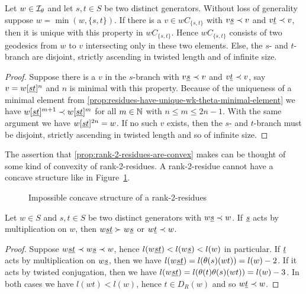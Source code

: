 \begin{prop}
	Let $w \in \mathcal{I}_{\theta}$ and let $s,t \in S$ be two distinct generators. Without loss of generality suppose $w = \min(w, \{s,t\})$. If there is a $v \in wC_{\{s,t\}}$ with $v \underline{s} \prec v$ and $v \underline{t} \prec v$, then it is unique with this property in $wC_{\{s,t\}}$. Hence $wC_{\{s,t\}}$ consists of two geodesics from $w$ to $v$ intersecting only in these two elements. Else, the $s$- and $t$-branch are disjoint, strictly ascending in twisted length and of infinite size.

	\begin{proof}
		Suppose there is a $v$ in the $s$-branch with $v \underline{s} \prec v$ and $v \underline{t} \prec v$, say $v = w[\underline{s} \underline{t}]^n$ and $n$ is minimal with this property. Because of the uniqueness of a minimal element from \ref{prop:residues-have-unique-wk-theta-minimal-element} we have $w[\underline{s} \underline{t}]^{m+1} \prec w[\underline{s} \underline{t}]^m$ for all $m \in \mathbb{N}$ with $n \leq m \leq 2n - 1$. With the same argument we have $w[\underline{s} \underline{t}]^{2n} = w$. If no such $v$ exists, then the $s$- and $t$-branch must be disjoint, strictly ascending in twisted length and so of infinite size.
	\end{proof}
\end{prop}

The assertion that \ref{prop:rank-2-residues-are-convex} makes can be thought of some kind of convexity of rank-2-residues. A rank-2-residue cannot have a concave structure like in Figure~\ref{fig:concave-rank-2-residue}.

\begin{figure}[ht]
	\centering
	
	\caption{Impossible concave structure of a rank-2-residues}
	\label{fig:concave-rank-2-residue}
\end{figure}

\begin{prop}
	Let $w \in S$ and $s,t \in S$ be two distinct generators with $w \underline{s} \prec w$. If $\underline{s}$ acts by multiplication on $w$, then $w \underline{s} \underline{t} \succ w \underline{s}$ or $w \underline{t} \prec w$.

	\begin{proof}
		Suppose $w \underline{s} \underline{t} \prec w \underline{s} \prec w$, hence $l(w \underline{s} \underline{t}) < l(w \underline{s}) < l(w)$ in particular. If $\underline{t}$ acts by multiplication on $w \underline{s}$, then we have $l(w \underline{s} \underline{t}) = l(\theta(s)(wt)) = l(w) - 2$. If it acts by twisted conjugation, then we have $l(w \underline{s} \underline{t}) = l(\theta(t)\theta(s)(wt)) = l(w) - 3$. In both cases we have $l(wt) < l(w)$, hence $t \in D_R(w)$ and so $w \underline{t} \prec w$.
	\end{proof}
\end{prop}


